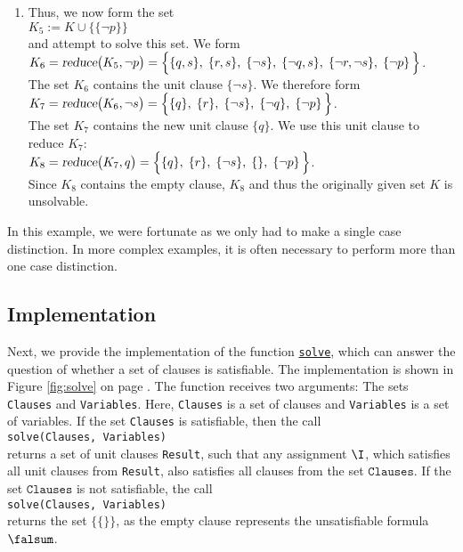 \begin{enumerate}
\item Thus, we now form the set
      \\[0.2cm]
      \hspace*{1.3cm} $K_5 := K \cup \bigl\{ \{\neg p\} \bigr\}$ \\[0.2cm]
      and attempt to solve this set. We form
      \\[0.2cm]
      \hspace*{1.3cm} 
      $K_6 = \textsl{reduce}\bigl(K_5, \neg p\bigr) =
      \Big\{ \{q, s\},\; \{r, s\},\;\{\neg s\},\; \{\neg q, s\},\; \{\neg r, \neg s\},\;\{\neg p\}\, \Big\}$.
      \\[0.2cm]
      The set $K_6$ contains the unit clause $\{\neg s\}$.
      We therefore form \\[0.2cm]
      \hspace*{1.3cm} 
      $K_7 = \textsl{reduce}\bigl(K_6, \neg s\bigr) =\Big\{ \{q\},\; \{r\},\;\{\neg s\},\; \{\neg q\},\;\{\neg p\}\, \Big\}$.
      \\[0.2cm]
      The set $K_7$ contains the new unit clause $\{q\}$.  We use this unit clause to reduce $K_7$:
      \\[0.2cm]
      \hspace*{1.3cm} 
      $K_8 = \textsl{reduce}\bigl(K_7, q \bigr) =\Big\{ \{q\},\; \{r\},\;\{\neg s\},\; \{\},\;\{\neg p\}\, \Big\}$.
      \\[0.2cm]
      Since $K_8$ contains the empty clause, $K_8$ and thus the originally
      given set $K$ is unsolvable.
\end{enumerate}
In this example, we were fortunate as we only had to make a single case distinction.
In more complex examples, it is often necessary to perform more than one case distinction.

\subsection{Implementation}
Next, we provide the implementation of the function 
\href{https://github.com/karlstroetmann/Logic/blob/master/SetlX/davis-putnam.stlx}{\texttt{solve}}, 
which can answer the question of whether a set of clauses is satisfiable. The
implementation is shown in Figure \ref{fig:solve} on page \pageref{fig:solve}.
The function receives two arguments: The sets \texttt{Clauses} and \texttt{Variables}.
Here, \texttt{Clauses} is a set of clauses and \texttt{Variables} is a set of
variables. If the set \texttt{Clauses} is satisfiable, then the call
\\[0.2cm]
\hspace*{1.3cm}
\texttt{solve(Clauses, Variables)} 
\\[0.2cm]
returns a set of unit clauses \texttt{Result}, such
that any assignment $\I$, which satisfies all unit clauses from \texttt{Result}, also satisfies all clauses from
the set $\texttt{Clauses}$. If the set $\texttt{Clauses}$ is not satisfiable, the call
\\[0.2cm]
\hspace*{1.3cm}
\texttt{solve(Clauses, Variables)} 
\\[0.2cm]
returns the set $\bigl\{ \{\} \bigr\}$, as the empty clause represents the unsatisfiable formula $\falsum$.


